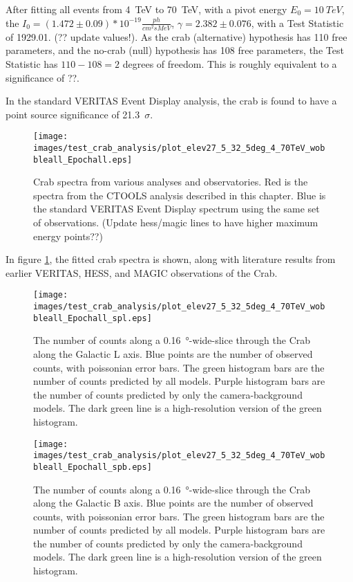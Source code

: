     After fitting all events from \SI{4}{TeV} to \SI{70}{TeV}, with a pivot energy $ E_{0}= \SI{10}{TeV} $, the $ I_{0} = \left(1.472\pm0.09\right)*10^{-19} \frac{ph}{cm^{2} s MeV} $, $ \gamma = 2.382 \pm 0.076 $, with a Test Statistic of 1929.01. (?? update values!).
    As the crab (alternative) hypothesis has 110 free parameters, and the no-crab (null) hypothesis has 108 free parameters, the Test Statistic has $ 110 - 108 = 2 $ degrees of freedom.
    This is roughly equivalent to a significance of ??.
    
    In the standard VERITAS Event Display analysis, the crab is found to have a point source significance of \SI{21.3}{$\sigma$}.
    
    
    \begin{figure}[h]
      \centering
      \texttt{[image: images/test\_crab\_analysis/plot\_elev27\_5\_32\_5deg\_4\_70TeV\_wobbleall\_Epochall.eps]}
      \caption[Crab Test Spectrum]
      {
        Crab spectra from various analyses and observatories.
        Red is the spectra from the CTOOLS analysis described in this chapter.
        Blue is the standard VERITAS Event Display spectrum using the same set of observations.
        (Update hess/magic lines to have higher maximum energy points??)
      }
      \label{fig:crab_test_spectra}
    \end{figure}
    
    In figure \ref{fig:crab_test_spectra}, the fitted crab spectra is shown, along with literature results from earlier VERITAS, HESS, and MAGIC observations of the Crab.
    
    \begin{figure}[h]
      \centering
      \texttt{[image: images/test\_crab\_analysis/plot\_elev27\_5\_32\_5deg\_4\_70TeV\_wobbleall\_Epochall\_spl.eps]}
      \caption[Crab Profile along Galactic L]
      {
        The number of counts along a \SI{0.16}{\degree}-wide-slice through the Crab along the Galactic L axis.
        Blue points are the number of observed counts, with poissonian error bars.
        The green histogram bars are the number of counts predicted by all models.
        Purple histogram bars are the number of counts predicted by only the camera-background models.
        The dark green line is a high-resolution version of the green histogram.
      }
      \label{fig:crab_profile_l}
    \end{figure}

    \begin{figure}[h]
      \centering
      \texttt{[image: images/test\_crab\_analysis/plot\_elev27\_5\_32\_5deg\_4\_70TeV\_wobbleall\_Epochall\_spb.eps]}
      \caption[Crab Profile along Galactic B]
      {
        The number of counts along a \SI{0.16}{\degree}-wide-slice through the Crab along the Galactic B axis.
        Blue points are the number of observed counts, with poissonian error bars.
        The green histogram bars are the number of counts predicted by all models.
        Purple histogram bars are the number of counts predicted by only the camera-background models.
        The dark green line is a high-resolution version of the green histogram.
      }
      \label{fig:crab_profile_b}
    \end{figure}
    
